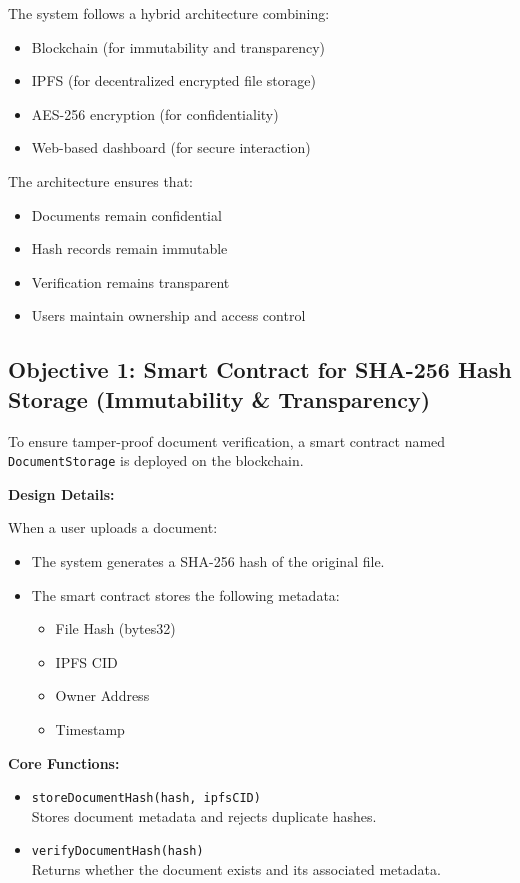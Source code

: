 \documentclass[12pt]{article}
\begin{document}
The system follows a hybrid architecture combining:

\begin{itemize}
\item Blockchain (for immutability and transparency)
\item IPFS (for decentralized encrypted file storage)
\item AES-256 encryption (for confidentiality)
\item Web-based dashboard (for secure interaction)
\end{itemize}

The architecture ensures that:

\begin{itemize}
\item Documents remain confidential
\item Hash records remain immutable
\item Verification remains transparent
\item Users maintain ownership and access control
\end{itemize}

\subsection{Objective 1: Smart Contract for SHA-256 Hash Storage (Immutability \& Transparency)}

To ensure tamper-proof document verification, a smart contract named \texttt{DocumentStorage} is deployed on the blockchain.

\textbf{Design Details:}

When a user uploads a document:

\begin{itemize}
\item The system generates a SHA-256 hash of the original file.
\item The smart contract stores the following metadata:
\begin{itemize}
\item File Hash (bytes32)
\item IPFS CID
\item Owner Address
\item Timestamp
\end{itemize}
\end{itemize}

\textbf{Core Functions:}

\begin{itemize}
\item \texttt{storeDocumentHash(hash, ipfsCID)} \\ 
Stores document metadata and rejects duplicate hashes.

\item \texttt{verifyDocumentHash(hash)} \\ 
Returns whether the document exists and its associated metadata.
\end{itemize}
\end{document}
